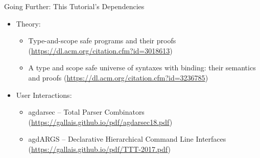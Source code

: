 \documentclass{beamer}
\begin{document}
\begin{frame}{Going Further: This Tutorial's Dependencies}

\begin{itemize}
  \item Theory:
    \begin{itemize}
      \item Type-and-scope safe programs and their proofs (\url{https://dl.acm.org/citation.cfm?id=3018613})
      \item A type and scope safe universe of syntaxes with binding: their semantics and proofs (\url{https://dl.acm.org/citation.cfm?id=3236785})
    \end{itemize}
  \item User Interactions:
    \begin{itemize}
      \item agdarsec -- Total Parser Combinators (\url{https://gallais.github.io/pdf/agdarsec18.pdf})
      \item agdARGS -- Declarative Hierarchical Command Line Interfaces (\url{https://gallais.github.io/pdf/TTT-2017.pdf})
    \end{itemize}
\end{itemize}
\end{frame}
\end{document}
